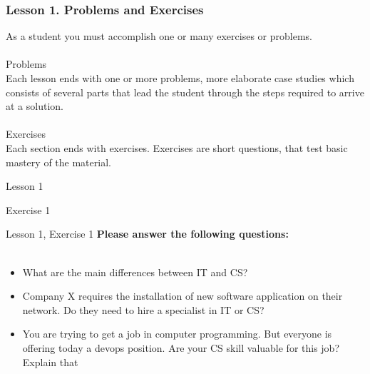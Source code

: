 \documentclass[aspectratio=1610]{beamer}
\begin{document}

\begin{frame}
\frametitle{Lesson 1. Problems and Exercises}
\LARGE
As a student you must accomplish one or many exercises or problems.\\~\\
\Large \alert{Problems}\\
Each lesson ends with one or more problems, more elaborate case studies which consists of several parts that lead the student through the steps required to arrive at a solution.
\\~\\ 
\Large \alert{Exercises} \\
Each section ends with exercises. Exercises are short questions, that test basic mastery of the material.
\end{frame}

\begin{frame}{Lesson 1}{}
\begin{center}
\Huge Exercise 1
\end{center}
\end{frame}

\begin{frame}{Lesson 1, Exercise 1}{}
\Large
\textbf{Please answer the following questions:}\\~\\ 

\Large{
\begin{itemize}
    \item What are the main differences between IT and CS?
    \item Company X requires the installation of new software application on their network. Do they need to hire a specialist in IT or CS?
    \item You are trying to get a job in computer programming. But everyone is offering today a devops position. Are your CS skill valuable for this job? Explain that 
\end{itemize}}

\end{frame}
\end{document}
